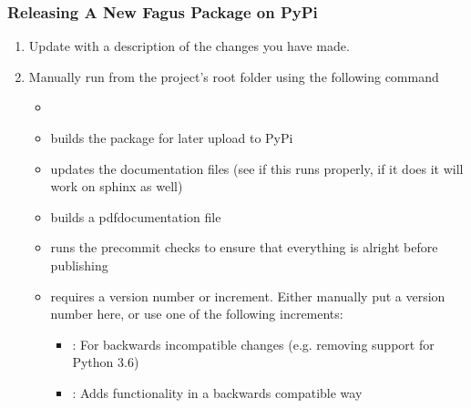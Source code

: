 \documentclass[a4paper,10pt,english]{sphinxmanual}
\begin{document}
\subsubsection{Releasing A New Fagus Package on PyPi}
\label{\detokenize{CONTRIBUTING:releasing-a-new-fagus-package-on-pypi}}\begin{enumerate}
%
\item {}
\sphinxAtStartPar
Update  with a description of the changes you have made.

\item {}
\sphinxAtStartPar
Manually run  from the project’s root folder using the following command
\begin{itemize}
\item {}
\sphinxAtStartPar
{}

\item {}
\sphinxAtStartPar
{} builds the package for later upload to PyPi

\item {}
\sphinxAtStartPar
{} updates the documentation files (see if this runs properly, if it does it will work on sphinx as well)

\item {}
\sphinxAtStartPar
{} builds a pdf\sphinxhyphen{}documentation file

\item {}
\sphinxAtStartPar
{} runs the pre\sphinxhyphen{}commit checks to ensure that everything is alright before publishing

\item {}
\sphinxAtStartPar
{} requires a version number or increment. Either manually put a version number here, or use one of the following increments:
\begin{itemize}
\item {}
\sphinxAtStartPar
{}: For backwards incompatible changes (e.g. removing support for Python 3.6)

\item {}
\sphinxAtStartPar
{}: Adds functionality in a backwards compatible way


\end{itemize}
\end{itemize}
\end{enumerate}
\end{document}

